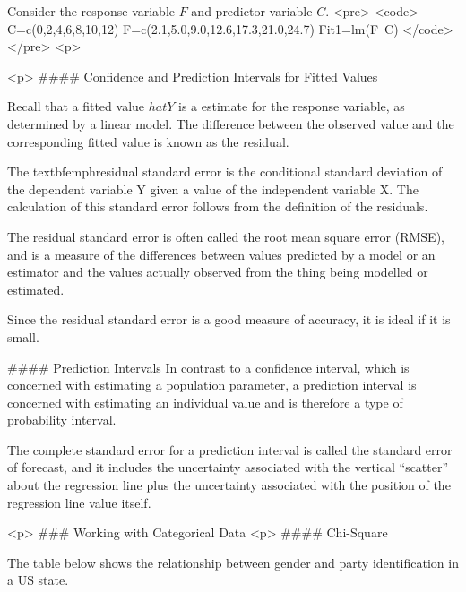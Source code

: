 Consider the response variable $F$ and predictor variable $C$.
<pre>
<code>
C=c(0,2,4,6,8,10,12) 
F=c(2.1,5.0,9.0,12.6,17.3,21.0,24.7)
Fit1=lm(F~C)
</code>
</pre>
<p>


<p>
#### {Confidence and Prediction Intervals for Fitted Values} 

Recall that a fitted value $hat{Y}$ is a estimate for the response variable, as determined by a linear model. The difference between the observed value and the corresponding fitted value is known as the residual.

The textbf{emph{residual standard error}} is the conditional standard deviation of the dependent variable Y given a value of the independent variable X. The calculation of this standard error follows from the definition of the residuals.

The residual standard error is often called the root mean square error (RMSE), and is a measure of the differences between values predicted by a model or an estimator and the values actually observed from the thing being modelled or estimated.

Since the residual standard error is a good measure of accuracy, it is ideal if it is small.


#### {Prediction Intervals}
In contrast to a confidence interval, which is concerned with estimating a population parameter, a prediction interval is concerned with estimating an individual value and is therefore a type of probability interval. 

The complete standard error for a prediction interval is called the standard error of forecast, and it includes the uncertainty associated with the vertical “scatter” about the regression line plus the uncertainty associated with the position of the regression line value itself.










<p>
### {Working with Categorical Data}
<p>
#### {Chi-Square}

The table below shows the relationship between gender and party identification in a US state.



